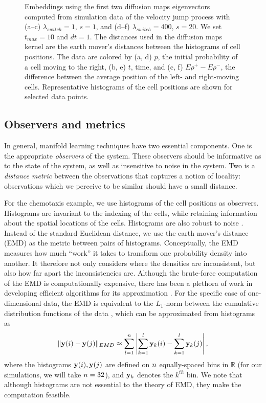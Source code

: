 \begin{figure}[t!]
\begin{subfigure}{\figwidth}
\caption{}
\label{subfig:large_lambda_rho}
\end{subfigure}
\caption{Embeddings using the first two diffusion maps eigenvectors computed from simulation data of the velocity jump process with (a--c) $\lambda_{switch}=1$, $s=1$, and (d--f) $\lambda_{switch}=400$, $s=20$.  We set $t_{max} = 10$ and $dt=1$. The distances used in the diffusion maps kernel are the earth mover's distances between the histograms of cell positions. The data are colored by (a, d) $p$, the initial probability of a cell moving to the right, (b, e) $t$, time, and (c, f) $E \rho^+ - E \rho^-$, the difference between the average position of the left- and right-moving cells. Representative histograms of the cell positions are shown for selected data points. }
\label{fig:dmaps_embed_emd}
\end{figure}

\subsection{Observers and metrics}

In general, manifold learning techniques have two essential components.
%
One is the appropriate {\em observers} of the system.
%
These observers should be informative as to the state of the system, as well as insensitive to noise in the system.
%
Two is a {\em distance metric} between the observations that captures a notion of locality: observations which we perceive to be similar should have a small distance.

For the chemotaxis example, we use histograms of the cell positions as observers.
%
Histograms are invariant to the indexing of the cells, while retaining information about the spatial locations of the cells.
%
Histograms are also robust to noise \cite{talmon2013empirical}.
%
Instead of the standard Euclidean distance, we use the earth mover's distance (EMD) \cite{rubner2000earth} as the metric between pairs of histograms.
%
Conceptually, the EMD measures how much ``work'' it takes to transform one probability density into another.
%
It therefore not only considers where the densities are inconsistent, but also how far apart the inconsistencies are.
%
Although the brute-force computation of the EMD is computationally expensive, there has been a plethora of work in developing efficient algorithms for its approximation \cite{Pele-eccv2008, Pele-iccv2009}.
%
For the specific case of one-dimensional data, the EMD is equivalent to the $L_1$-norm between the cumulative distribution functions of the data \cite{rubner2000perceptual}, which can be approximated from histograms as
\begin{equation}
\| \mathbf{y}(i) - \mathbf{y}(j) \|_{EMD} \approx \sum_{l=1}^{n} \left| \sum_{k=1}^l \mathbf{y}_k(i) - \sum_{k=1}^l \mathbf{y}_k(j) \right|,
\end{equation}
where the histograms $\mathbf{y}(i), \mathbf{y}(j)$ are defined on $n$ equally-spaced bins in $\mathbb{R}$ (for our simulations, we will take $n=32$), and $\mathbf{y}_k$ denotes the $k^{th}$ bin.
%
We note that although histograms are not essential to the theory of EMD, they make the computation feasible.


